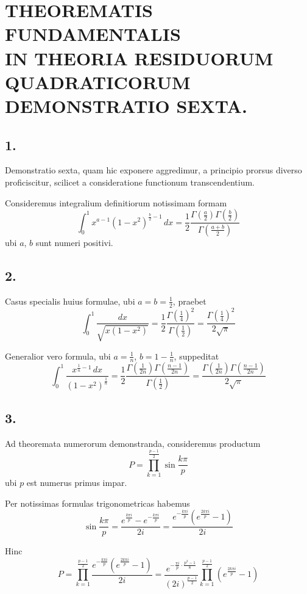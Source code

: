 \documentclass[12pt,a4paper]{article}
\theoremstyle{plain}
\theoremstyle{definition}
\theoremstyle{remark}
\begin{document}
\newpage
\section*{THEOREMATIS FUNDAMENTALIS\\IN THEORIA RESIDUORUM QUADRATICORUM\\DEMONSTRATIO SEXTA.}

\subsection*{1.}
Demonstratio sexta, quam hic exponere aggredimur, a principio prorsus diverso proficiscitur, scilicet a consideratione functionum transcendentium.

Consideremus integralium definitiorum notissimam formam
\[\int_0^1 x^{a-1}(1-x^2)^{\frac{b}{2}-1}\,dx = \frac{1}{2}\frac{\Gamma(\frac{a}{2})\Gamma(\frac{b}{2})}{\Gamma(\frac{a+b}{2})}\]
ubi $a$, $b$ sunt numeri positivi.

\subsection*{2.}
Casus specialis huius formulae, ubi $a=b=\frac{1}{2}$, praebet
\[\int_0^1 \frac{dx}{\sqrt{x(1-x^2)}} = \frac{1}{2}\frac{\Gamma(\frac{1}{4})^2}{\Gamma(\frac{1}{2})} = \frac{\Gamma(\frac{1}{4})^2}{2\sqrt{\pi}}\]

Generalior vero formula, ubi $a=\frac{1}{n}$, $b=1-\frac{1}{n}$, suppeditat
\[\int_0^1 \frac{x^{\frac{1}{n}-1}\,dx}{(1-x^2)^{\frac{1}{n}}} = \frac{1}{2}\frac{\Gamma(\frac{1}{2n})\Gamma(\frac{n-1}{2n})}{\Gamma(\frac{1}{2})} = \frac{\Gamma(\frac{1}{2n})\Gamma(\frac{n-1}{2n})}{2\sqrt{\pi}}\]

\subsection*{3.}
Ad theoremata numerorum demonstranda, consideremus productum
\[P = \prod_{k=1}^{\frac{p-1}{2}} \sin\frac{k\pi}{p}\]
ubi $p$ est numerus primus impar.

Per notissimas formulas trigonometricas habemus
\[\sin\frac{k\pi}{p} = \frac{e^{\frac{k\pi i}{p}} - e^{-\frac{k\pi i}{p}}}{2i} = \frac{e^{-\frac{k\pi i}{p}}(e^{\frac{2k\pi i}{p}} - 1)}{2i}\]

Hinc
\[P = \prod_{k=1}^{\frac{p-1}{2}} \frac{e^{-\frac{k\pi i}{p}}(e^{\frac{2k\pi i}{p}} - 1)}{2i} = \frac{e^{-\frac{\pi i}{p}\cdot\frac{p^2-1}{8}}}{(2i)^{\frac{p-1}{2}}} \prod_{k=1}^{\frac{p-1}{2}}(e^{\frac{2k\pi i}{p}} - 1)\]
\end{document}
